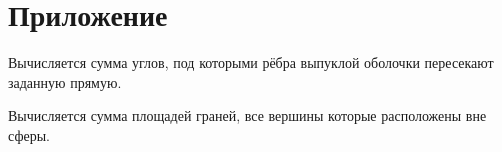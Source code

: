 \section{Приложение}

Вычисляется сумма углов, под которыми рёбра выпуклой оболочки пересекают заданную прямую.



Вычисляется сумма площадей граней, все вершины которые расположены вне сферы.


